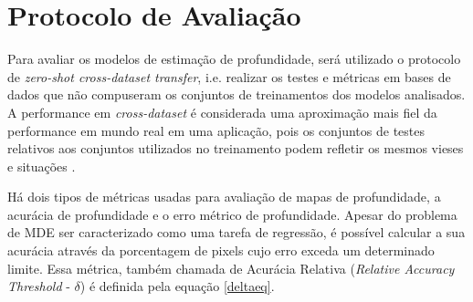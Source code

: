 



\section{Protocolo de Avaliação}

Para avaliar os modelos de estimação de profundidade, será utilizado o protocolo de \textit{zero-shot cross-dataset transfer}, i.e. realizar os testes e métricas em bases de dados que não compuseram os conjuntos de treinamentos dos modelos analisados. A performance em \textit{cross-dataset} é considerada uma aproximação mais fiel da performance em mundo real em uma aplicação, pois os conjuntos de testes relativos aos conjuntos utilizados no treinamento podem refletir os mesmos vieses e situações \cite{ranftl2020towards}.

Há dois tipos de métricas usadas para avaliação de mapas de profundidade, a acurácia de profundidade e o erro métrico de profundidade. Apesar do problema de MDE ser caracterizado como uma tarefa de regressão, é possível calcular a sua acurácia através da porcentagem de pixels cujo erro exceda um determinado limite. Essa métrica, também chamada de Acurácia Relativa (\textit{Relative Accuracy Threshold} - $\delta$) é definida pela equação \ref{deltaeq}.

